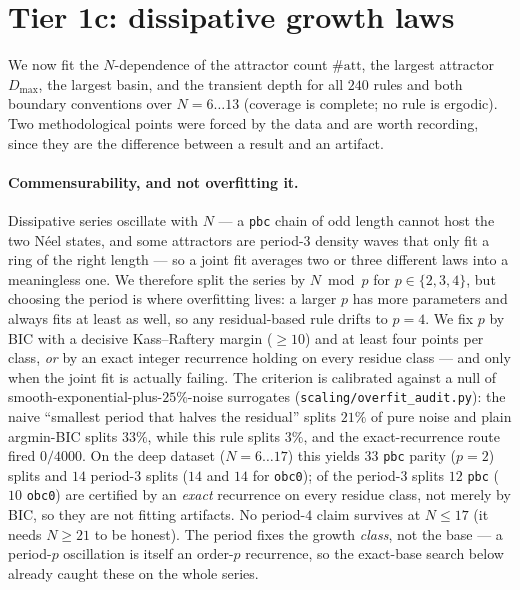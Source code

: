 \documentclass[11pt]{article}
\newcommand{\rt}[1]{\texttt{#1}}
\newcommand{\fn}[1]{\texttt{#1}}
\begin{document}
\begin{table}[h]\centering\small
\caption{Exact Cesaro rank vs.\ the graph-resolved per-class fixed dimension
(pbc, $N=4$). A zero gap (rule 0, pure decay) is fully classical; a large gap
flags protected coherence.}
\label{tab:cesaro}\end{table}

\section{Tier 1c: dissipative growth laws}
\label{sec:scaling}
We now fit the $N$-dependence of the attractor count $\#\mathrm{att}$, the
largest attractor $D_{\max}$, the largest basin, and the transient depth for all
$240$ rules and both boundary conventions over $N=6\ldots13$ (coverage is
complete; no rule is ergodic). Two methodological points were forced by the data
and are worth recording, since they are the difference between a result and an
artifact.

\paragraph{Commensurability, and not overfitting it.} Dissipative series oscillate
with $N$ --- a \rt{pbc} chain of odd length cannot host the two N\'eel states, and
some attractors are period-$3$ density waves that only fit a ring of the right
length --- so a joint fit averages two or three different laws into a meaningless
one. We therefore split the series by $N\bmod p$ for $p\in\{2,3,4\}$, but choosing
the period is where overfitting lives: a larger $p$ has more parameters and always
fits at least as well, so any residual-based rule drifts to $p=4$. We fix $p$ by
BIC with a decisive Kass--Raftery margin ($\ge10$) and at least four points per
class, \emph{or} by an exact integer recurrence holding on every residue class ---
and only when the joint fit is actually failing. The criterion is calibrated
against a null of smooth-exponential-plus-$25\%$-noise surrogates
(\fn{scaling/overfit\_audit.py}): the naive ``smallest period that halves the
residual'' splits $21\%$ of pure noise and plain argmin-BIC splits $33\%$, while
this rule splits $3\%$, and the exact-recurrence route fired $0/4000$. On the deep
dataset ($N=6\ldots17$) this yields $33$ \rt{pbc} parity ($p{=}2$) splits and $14$
period-$3$ splits ($14$ and $14$ for \rt{obc0}); of the period-$3$ splits $12$
\rt{pbc} ($10$ \rt{obc0}) are certified by an \emph{exact} recurrence on every
residue class, not merely by BIC, so they are not fitting artifacts. No
period-$4$ claim survives at $N\le17$ (it needs $N\ge21$ to be honest). The period fixes the growth
\emph{class}, not the base --- a period-$p$ oscillation is itself an order-$p$
recurrence, so the exact-base search below already caught these on the whole
series.
\end{document}
